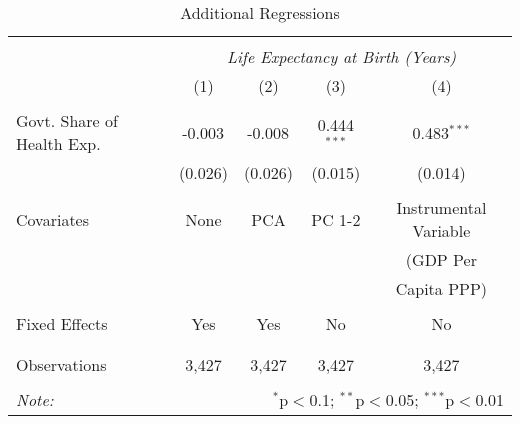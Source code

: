 \begin{table}[!htbp] \centering
  \caption{Additional Regressions \label{additional_regs}}
\begin{tabular}{@{\extracolsep{5pt}}lcccc}
\\[-1.8ex]\hline
\hline \\[-1.8ex]
& \multicolumn{4}{c}{\textit{Life Expectancy at Birth (Years)}} \
\cr \
\\[-1.8ex] & (1) & (2) & (3) & (4) \\
\hline \\[-1.8ex]
 Govt. Share of Health Exp. & -0.003$^{}$ & -0.008$^{}$ & 0.444$^{***}$ & 0.483$^{***}$ \\
  & (0.026) & (0.026) & (0.015) & (0.014) \\
  &  &  &  &  \\
 Covariates & None & PCA & PC 1-2 & Instrumental Variable \\
  &  &  &  & (GDP Per \\
  &  &  &  & Capita PPP) \\
  &  &  &  &  \\
 Fixed Effects & Yes & Yes & No & No \\
  &  &  &  &  \\
\hline \\[-1.8ex]
 Observations & 3,427 & 3,427 & 3,427 & 3,427 \\
\hline
\hline \\[-1.8ex]
\textit{Note:} & \multicolumn{4}{r}{$^{*}$p$<$0.1; $^{**}$p$<$0.05; $^{***}$p$<$0.01} \\
\end{tabular}
\end{table}